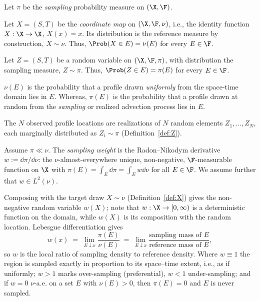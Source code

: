 \begin{definition}
\label{def:pi}
Let $\pi$ be the \emph{sampling} probability measure on $(\X,\F)$.
\end{definition}


\begin{definition}
\label{def:X}
Let $X = (S,T)$ be the \emph{coordinate map} on $(\X,\F,\nu)$, i.e., the identity function $X : \X \to \X$, $X(x) = x$.
Its distribution is the reference measure by construction, $X \sim \nu$.
Thus, $\Prob(X \in E) = \nu(E)$ for every $E \in \F$. 
\end{definition}

\begin{definition}
\label{def:Z}
Let $Z = (S,T)$ be a random variable on $(\X,\F,\pi)$, with distribution the sampling measure, $Z \sim \pi$.
Thus, $\Prob(Z \in E) = \pi(E)$ for every $E \in \F$.
\end{definition}

$\nu(E)$ is the probability that a profile drawn \emph{uniformly} from the space-time domain lies in $E$.
Whereas, $\pi(E)$ is the probability that a profile drawn at random from the \emph{sampling} or realized advection process lies in $E$.

\begin{definition}
\label{def:Zi}
The $N$ observed profile locations are realizations of $N$ random elements $Z_1,\dots,Z_N$, each marginally distributed as $Z_i \sim \pi$ (Definition~\ref{def:Z}).
\end{definition}

\begin{definition}
\label{def:w}
Assume $\pi \ll \nu$. The \emph{sampling weight} is the Radon--Nikodym
derivative $w := \dd\pi/\dd\nu$: the $\nu$-almost-everywhere unique,
non-negative, $\F$-measurable function on $\X$ with
$\pi(E)=\int_E \dd\pi = \int_E w\dd\nu$ for all $E\in\F$. We assume further that
$w \in L^2(\nu)$.
\end{definition}

Composing with the target draw $X\sim\nu$ (Definition~\ref{def:X}) gives
the non-negative random variable $w(X)$; note that $w:\X\to[0,\infty)$ is
a deterministic function on the domain, while $w(X)$ is its composition
with the random location. Lebesgue differentiation gives
\[
  w(x) \;=\; \lim_{E \downarrow x} \frac{\pi(E)}{\nu(E)}
        \;=\; \lim_{E \downarrow x}
              \frac{\text{sampling mass of } E}{\text{reference mass of } E},
\]
so $w$ is the local ratio of sampling density to reference density. Where
$w \equiv 1$ the region is sampled exactly in proportion to its
space--time extent, i.e., as if uniformly; $w > 1$ marks over-sampling
(preferential), $w < 1$ under-sampling; and if $w = 0$ $\nu$-a.e. on a set
$E$ with $\nu(E)>0$, then $\pi(E)=0$ and $E$ is never sampled.

